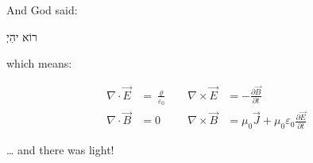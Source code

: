 \documentclass[preview,border=1cm]{standalone}
\begin{document}
And God said:

\begin{center}
{\ezr\huge רוֹא יהִיְ}
\end{center}

which means:

\begin{align*}
\nabla \cdot \vec{E} &= \frac{\varrho}{\varepsilon_0}
\quad & \nabla \times \vec{E} &= - \frac{\partial \vec{B}}{\partial t} \\
\nabla \cdot \vec{B} &= 0
\quad & \nabla \times \vec{B} &= \mu_{0}\vec{J}
+ \mu_{0}\varepsilon_{0}\frac{\partial \vec{E}}{\partial t}
\end{align*}

\begin{flushright}
\dots{} and there was light!
\end{flushright}
\end{document}
